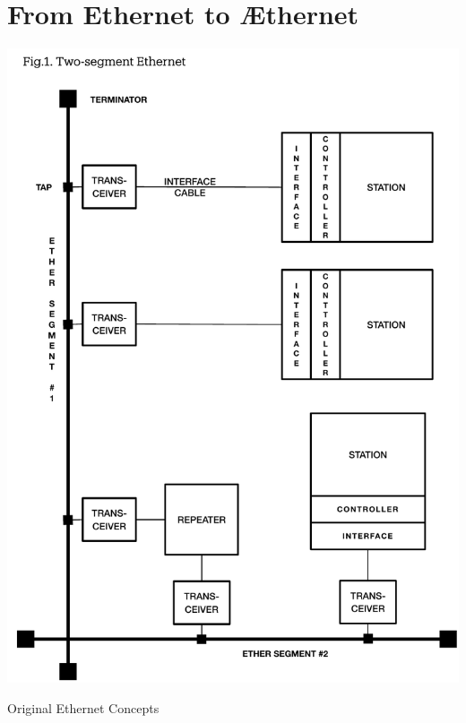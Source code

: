 
\section{From Ethernet to  Æthernet}


\begin{marginfigure}
  \includegraphics[width=1.2\linewidth, trim=0mm 0mm 0mm 18mm, clip]{../../FIGURES/Omni-Figure-1.pdf}
  \caption{Original Ethernet Concepts}
  \vspace{2em}
\end{marginfigure}


